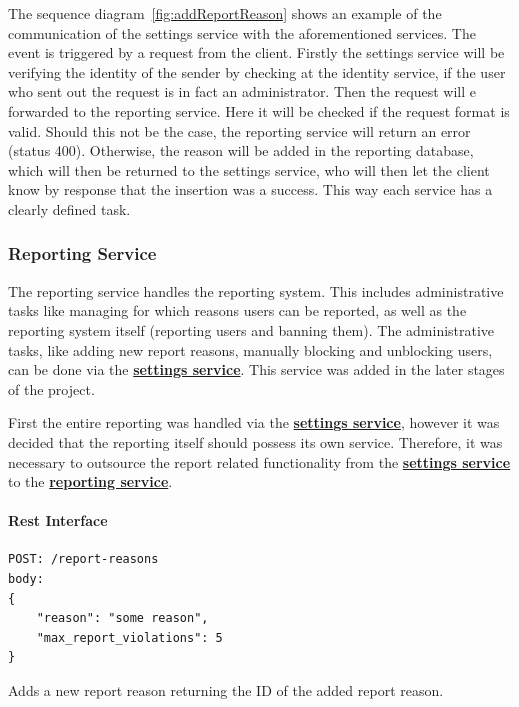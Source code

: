 The sequence diagram~\ref{fig:addReportReason} shows an example of the communication of the settings service with the
aforementioned services.
The event is triggered by a request from the client.
Firstly the settings service will be verifying the identity of the sender by checking at the identity service, if the
user who sent out the request is in fact an administrator.
Then the request will e forwarded to the reporting service.
Here it will be checked if the request format is valid.
Should this not be the case, the reporting service will return an error (status 400).
Otherwise, the reason will be added in the reporting database, which will then be returned to the settings service,
who will then let the client know by response that the insertion was a success.
This way each service has a clearly defined task.

\subsubsection{Reporting Service}\label{subsubsec:reportingSer}

The reporting service handles the reporting system.
This includes administrative tasks like managing for which reasons users can be reported, as well as the reporting
system itself (reporting users and banning them).
The administrative tasks, like adding new report reasons, manually blocking and unblocking users, can be done via the
\hyperref[subsubsec:settingsSer]{\textbf{settings service}}.
This service was added in the later stages of the project.

First the entire reporting was handled via the \hyperref[subsubsec:settingsSer]{\textbf{settings service}}, however it
was decided that the reporting itself should possess its own service. %
Therefore, it was necessary to outsource the report related functionality from the
\hyperref[subsubsec:settingsSer]{\textbf{settings service}} to the
\hyperref[subsubsec:reportingSer]{\textbf{reporting service}}.

\paragraph{Rest Interface}
\begin{lstlisting}[label={lst:lstlisting7}]
POST: /report-reasons
body:
{
    "reason": "some reason",
    "max_report_violations": 5
}
\end{lstlisting}

Adds a new report reason returning the ID of the added report reason.

